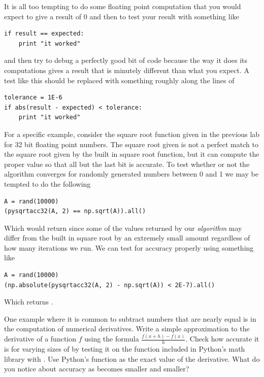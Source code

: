 It is all too tempting to do some floating point computation that you would expect to give a result of 0 and then to test your result with something like
\begin{lstlisting}
if result == expected:
    print "it worked"
\end{lstlisting}
and then try to debug a perfectly good bit of code because the way it does its computations gives a result that is minutely different than what you expect.
A test like this should be replaced with something roughly along the lines of
\begin{lstlisting}
tolerance = 1E-6
if abs(result - expected) < tolerance:
    print "it worked"
\end{lstlisting}
For a specific example, consider the square root function given in the previous lab for 32 bit floating point numbers.
The square root given is not a perfect match to the square root given by the built in square root function, but it can compute the proper value so that all but the last bit is accurate.
To test whether or not the algorithm converges for randomly generated numbers between 0 and 1 we may be tempted to do the following
\begin{lstlisting}
A = rand(10000)
(pysqrtacc32(A, 2) == np.sqrt(A)).all()
\end{lstlisting}
Which would return  since some of the values returned by our \emph{algorithm} may differ from the built in square root by an extremely small amount regardless of how many iterations we run.
We can test for accuracy properly using something like
\begin{lstlisting}
A = rand(10000)
(np.absolute(pysqrtacc32(A, 2) - np.sqrt(A)) < 2E-7).all()
\end{lstlisting}
Which returns .

\begin{problem}
One example where it is common to subtract numbers that are nearly equal is in the computation of numerical derivatives.
Write a simple approximation to the derivative of a function $f$ using the formula $\frac{f(x+h) - f(x)}{h}$.
Check how accurate it is for varying sizes of  by testing it on the  function included in Python's math library with .
Use Python's  function as the exact value of the derivative.
What do you notice about accuracy as  becomes smaller and smaller?
\end{problem}

